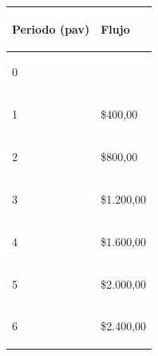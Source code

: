 \begin{spacing}{0.1}
\begin{center}
\begin{tabular}{ |p{3.5cm}| p{3cm}|}
\hline 
\begin{center}\textbf{Periodo (pav) } \end{center}  & \begin{center} \textbf{Flujo} \end{center}  \\ \hline

\begin{center}0 \end{center}    &  \begin{center} \end{center} \\ \hline

\begin{center}1 \end{center}    &  \begin{center} \$400,00\end{center} \\ \hline

\begin{center}2 \end{center}    &  \begin{center} \$800,00\end{center} \\ \hline 

\begin{center}3 \end{center}    & \begin{center} \$1.200,00 \end{center}  \\ \hline

\begin{center}4 \end{center}    & \begin{center} \$1.600,00\end{center}  \\ \hline

\begin{center}5 \end{center}    & \begin{center} \$2.000,00 \end{center}  \\ \hline

\begin{center}6 \end{center}    & \begin{center} \$2.400,00 \end{center}  \\ \hline


\end{tabular}
\end{center}
\end{spacing}
